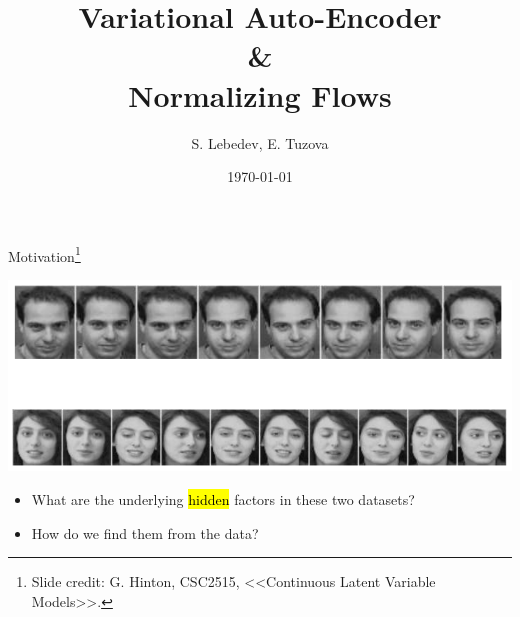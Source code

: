 \documentclass[unicode,11pt]{beamer}
\title{Variational Auto-Encoder \\
  \& \\
  Normalizing Flows}
\author{S. Lebedev, E. Tuzova}
\institute{JetBrains}
\date{\today}
\begin{document}
\begin{frame}
  \maketitle
\end{frame}


\begin{frame}{Motivation\footnote{Slide credit: G. Hinton, CSC2515, <<Continuous
      Latent Variable Models>>.}}
  \begin{center}
    \includegraphics[width=.8\textwidth]{images/motivation}
  \end{center}

  \begin{itemize}
  \item What are the underlying \hl{hidden} factors in these two datasets?
  \item How do we find them from the data?
  \end{itemize}
\end{frame}
\end{document}
